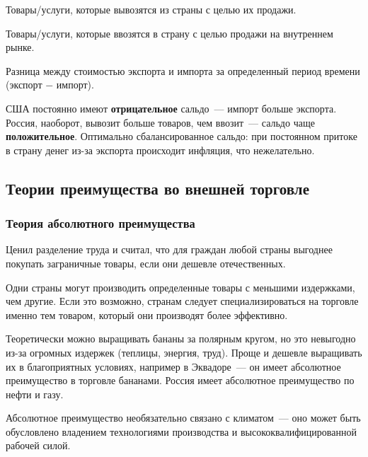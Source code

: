\documentclass[12pt]{article}
\begin{document}
    \begin{definition}[Экспорт]
    	Товары/услуги, которые вывозятся из страны с целью их продажи.
    \end{definition}
    
    \begin{definition}[Импорт]
    	Товары/услуги, которые ввозятся в страну с целью продажи на внутреннем рынке.
    \end{definition}
    
    \begin{definition}
    	Разница между стоимостью экспорта и импорта за определенный период времени (экспорт $-$ импорт).
    \end{definition}
    
    \begin{note}
    	США постоянно имеют \textbf{отрицательное} сальдо~--- импорт больше экспорта. Россия, наоборот, вывозит больше товаров, чем ввозит~--- сальдо чаще \textbf{положительное}. Оптимально сбалансированное сальдо: при постоянном притоке в страну денег из-за экспорта происходит инфляция, что нежелательно.
    \end{note}
    
    \subsection{Теории преимущества во внешней торговле}
    
    \subsubsection{Теория абсолютного преимущества}
    
    \begin{person}
    	Ценил разделение труда и считал, что для граждан любой страны выгоднее покупать заграничные товары, если они дешевле отечественных.
    \end{person}
    
    \begin{definition}
    	Одни страны могут производить определенные товары с меньшими издержками, чем другие. Если это возможно, странам следует специализироваться на торговле именно тем товаром, который они производят более эффективно.
    \end{definition}
    
    \begin{note}
    	Теоретически можно выращивать бананы за полярным кругом, но это невыгодно из-за огромных издержек (теплицы, энергия, труд). Проще и дешевле выращивать их в благоприятных условиях, например в Эквадоре~--- он имеет абсолютное преимущество в торговле бананами. Россия имеет абсолютное преимущество по нефти и газу.
    
    	Абсолютное преимущество необязательно связано с климатом~--- оно может быть обусловлено владением технологиями производства и высококвалифицированной рабочей силой.
    \end{note}
    
\end{document}
